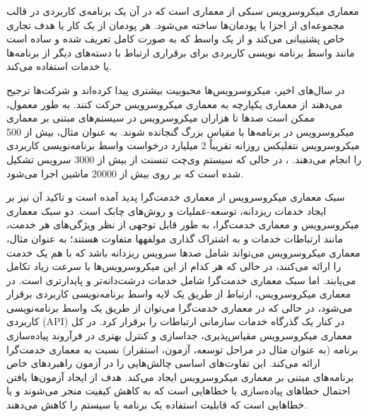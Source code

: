 


معماری میکروسرویس سبکی از معماری است که در آن یک برنامه‌ی کاربردی در قالب مجموعه‌ای از اجزا یا پودمان‌ها ساخته می‌شود. هر پودمان از یک کار یا هدف تجاری خاص پشتیبانی می‌کند و از یک واسط که به صورت کامل تعریف شده و ساده است مانند واسط برنامه نویسی کاربردی برای برقراری ارتباط با دسته‌های دیگر از برنامه‌ها یا خدمات استفاده می‌کند.

در سال‌های اخیر، میکروسرویس‌ها محبوبیت بیشتری پیدا کرده‌اند و شرکت‌ها ترجیح می‌دهند از معماری یکپارچه به معماری میکروسرویس حرکت کنند. به طور معمول، ممکن است صدها تا هزاران میکروسرویس در سیستم‌های مبتنی بر معماری میکروسرویس در برنامه‌ها با مقیاس بزرگ گنجانده شوند. به عنوان مثال، بیش از 500 میکروسرویس نتفلیکس روزانه تقریباً 2 میلیارد درخواست واسط برنامه‌نویسی کاربردی را انجام می‌دهند. ، در حالی که سیستم وی‌چت تنسنت از بیش از 3000 سرویس تشکیل شده است که بر روی بیش از 20000 ماشین اجرا می‌شود. 

سبک معماری میکروسرویس از معماری خدمت‌گرا پدید آمده است و تاکید آن نیز بر ایجاد خدمات ریزدانه‌، توسعه-عملیات و روش‌های چابک است. 
دو سبک معماری میکروسرویس و معماری خدمت‌گرا، به طور قابل توجهی از نظر ویژگی‌های هر خدمت، مانند ارتباطات خدمات و به اشتراک گذاری مولفهها متفاوت هستند؛ به عنوان مثال، معماری میکروسرویس می‌تواند شامل صدها سرویس ریزدانه باشد که با هم یک خدمت را ارائه می‌کنند، در حالی ‌که هر کدام از این میکروسرویس‌ها با سرعت زیاد تکامل می‌یابند. اما سبک معماری خدمت‌گرا شامل خدمات درشت‌دانه‌تر و پایدارتری است. در معماری میکروسرویس، ارتباط از طریق یک لایه واسط برنامه‌نویسی کاربردی برقرار می‌شود، در حالی که در معماری خدمت‌گرا می‌توان از طریق یک واسط برنامه‌نویسی کاربردی (API)  در کنار یک گذرگاه خدمات سازمانی ارتباطات را برقرار کرد. در کل معماری میکروسرویس مقیاس‌پذیری، جداسازی و کنترل بهتری در فرآروند پیاده‌سازی برنامه (به عنوان مثال در مراحل توسعه، آزمون، استقرار) نسبت به معماری خدمت‌گرا ارائه می‌کند.
این تفاوت‌های اساسی چالش‌هایی را در آزمون راهبردهای خاص برنامه‌های مبتنی بر معماری میکروسرویس ایجاد می‌کند. هدف از ایجاد آزمون‌ها یافتن احتمال خطاهای پیاده‌سازی یا خطاهایی است که به کاهش کیفیت منجر می‌شوند و یا خطاهایی است که قابلیت استفاده یک برنامه یا سیستم را کاهش می‌دهند. 


